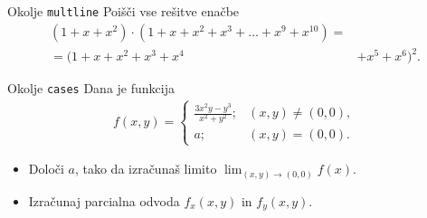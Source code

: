 \begin{frame}{Okolje \texttt{multline}}
	Poišči vse rešitve enačbe
	\begin{align*}
	(1+x+x^2) \cdot (1+x+x^2+x^3+\ldots+x^9+x^{10}) = \\
	=(1+x+x^2+x^3+x^4&+x^5+x^6)^2.
	\end{align*}
\end{frame}

\begin{frame}{Okolje \texttt{cases}}
	Dana je funkcija
	\begin{align*}
		f(x,y)=
		\begin{cases}
			\frac{3x^2y-y^3}{x^2+y^2}; &(x,y) \not= (0,0),\\
			a; &(x,y) = (0,0).
		\end{cases}
	\end{align*}
		
		
	\begin{itemize}
	\item Določi $a$, tako da izračunaš limito \( \lim_{(x,y)\to(0,0)} f(x). \)
	\item Izračunaj parcialna odvoda $\displaystyle f_x(x,y)$ in $\displaystyle f_y(x,y)$.
	\end{itemize}
\end{frame}
